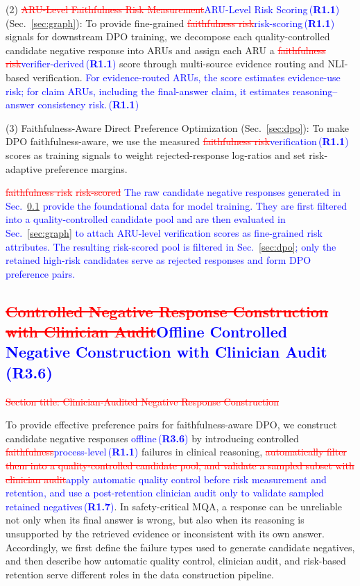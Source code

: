 \documentclass[a4paper,fleqn,doubleblind]{cas-sc}
\DeclareRobustCommand{\deleted}[1]{\textcolor{red}{\sout{#1}}}
\DeclareRobustCommand{\added}[1]{\textcolor{blue}{#1}}
\DeclareRobustCommand{\revtag}[1]{\textcolor{blue}{\scriptsize\,(\textbf{#1})}}
\begin{document}
(2) \deleted{ARU-Level Faithfulness Risk Measurement}\added{ARU-Level Risk Scoring}\revtag{R1.1} (Sec.~\ref{sec:graph}):
To provide fine-grained \deleted{faithfulness risk}\added{risk-scoring}\revtag{R1.1} signals for downstream DPO training, we decompose each quality-controlled candidate negative response into ARUs and assign each ARU a \deleted{faithfulness risk}\added{verifier-derived}\revtag{R1.1} score through multi-source evidence routing and NLI-based verification. \added{For evidence-routed ARUs, the score estimates evidence-use risk; for claim ARUs, including the final-answer claim, it estimates reasoning--answer consistency risk.}\revtag{R1.1}


(3) Faithfulness-Aware Direct Preference Optimization (Sec.~\ref{sec:dpo}):
To make DPO faithfulness-aware, we use the measured \deleted{faithfulness risk}\added{verification}\revtag{R1.1} scores as training signals to weight rejected-response log-ratios and set risk-adaptive preference margins.


\deleted{faithfulness risk}
\deleted{risk-scored}
\added{The raw candidate negative responses generated in Sec.~\ref{sec:cot} provide the foundational data for model training.}
\added{They are first filtered into a quality-controlled candidate pool and are then evaluated in Sec.~\ref{sec:graph} to attach ARU-level verification scores as fine-grained risk attributes.}
\added{The resulting risk-scored pool is filtered in Sec.~\ref{sec:dpo}; only the retained high-risk candidates serve as rejected responses and form DPO preference pairs.}


\subsection{\deleted{Controlled Negative Response Construction with Clinician Audit}\added{Offline Controlled Negative Construction with Clinician Audit}\revtag{R3.6}}
\label{sec:cot}
\deleted{Section title: Clinician-Audited Negative Response Construction}

To provide effective preference pairs for faithfulness-aware DPO, we construct candidate negative responses \added{offline}\revtag{R3.6} by introducing controlled \deleted{faithfulness}\added{process-level}\revtag{R1.1} failures in clinical reasoning, \deleted{automatically filter them into a quality-controlled candidate pool, and validate a sampled subset with clinician audit}\added{apply automatic quality control before risk measurement and retention, and use a post-retention clinician audit only to validate sampled retained negatives}\revtag{R1.7}.
In safety-critical MQA, a response can be unreliable not only when its final answer is wrong, but also when its reasoning is unsupported by the retrieved evidence or inconsistent with its own answer.
Accordingly, we first define the failure types used to generate candidate negatives, and then describe how automatic quality control, clinician audit, and risk-based retention serve different roles in the data construction pipeline.
\end{document}
